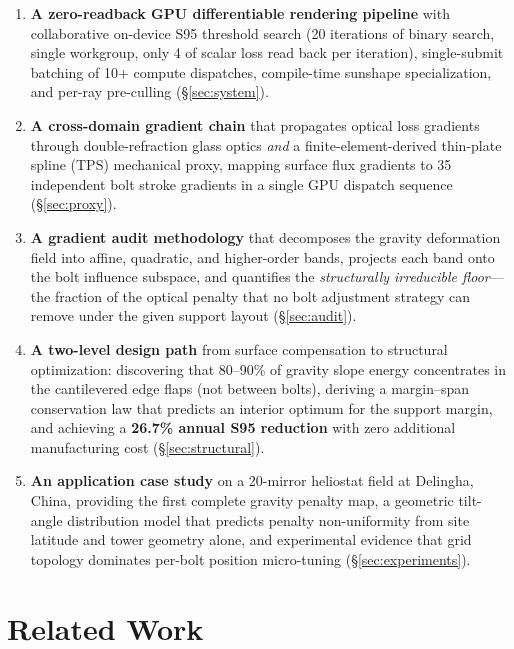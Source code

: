 \documentclass{CVM}
\begin{document}
\begin{enumerate}
  \item \textbf{A zero-readback GPU differentiable rendering pipeline} with
  collaborative on-device S95 threshold search (20 iterations of binary search,
  single workgroup, only \SI{4}{\byte} of scalar loss read back per
  iteration), single-submit batching of 10+ compute dispatches, compile-time
  sunshape specialization, and per-ray pre-culling (\S\ref{sec:system}).

  \item \textbf{A cross-domain gradient chain} that propagates optical loss
  gradients through double-refraction glass optics \emph{and} a
  finite-element-derived thin-plate spline (TPS) mechanical proxy, mapping
  surface flux gradients to 35 independent bolt stroke gradients in a single
  GPU dispatch sequence (\S\ref{sec:proxy}).

  \item \textbf{A gradient audit methodology} that decomposes the gravity
  deformation field into affine, quadratic, and higher-order bands, projects
  each band onto the bolt influence subspace, and quantifies the
  \emph{structurally irreducible floor}---the fraction of the optical penalty
  that no bolt adjustment strategy can remove under the given support layout
  (\S\ref{sec:audit}).

  \item \textbf{A two-level design path} from surface compensation to
  structural optimization: discovering that 80--90\% of gravity slope energy
  concentrates in the cantilevered edge flaps (not between bolts), deriving a
  margin--span conservation law that predicts an interior optimum for the
  support margin, and achieving a \textbf{26.7\% annual S95 reduction} with
  zero additional manufacturing cost (\S\ref{sec:structural}).

  \item \textbf{An application case study} on a 20-mirror heliostat field at
  Delingha, China, providing the first complete gravity penalty map, a
  geometric tilt-angle distribution model that predicts penalty non-uniformity
  from site latitude and tower geometry alone, and experimental evidence that
  grid topology dominates per-bolt position micro-tuning (\S\ref{sec:experiments}).
\end{enumerate}

\section{Related Work}
\end{document}
